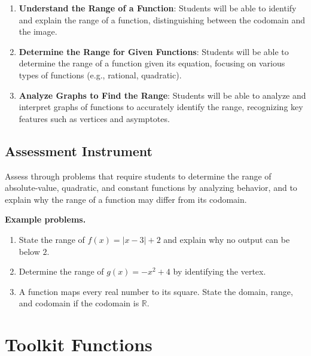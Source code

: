 \begin{enumerate}
    \item \textbf{Understand the Range of a Function}: Students will be able to identify and explain the range of a function, distinguishing between the codomain and the image.
    \item \textbf{Determine the Range for Given Functions}: Students will be able to determine the range of a function given its equation, focusing on various types of functions (e.g., rational, quadratic).
    \item \textbf{Analyze Graphs to Find the Range}: Students will be able to analyze and interpret graphs of functions to accurately identify the range, recognizing key features such as vertices and asymptotes.
\end{enumerate}

\subsection{Assessment Instrument}
\label{ssec:asse-7e68}

Assess through problems that require students to determine the range of absolute-value,
quadratic, and constant functions by analyzing behavior, and to explain why the range of a
function may differ from its codomain.

\textbf{Example problems.}

\begin{enumerate}
    \item State the range of $f(x) = |x - 3| + 2$ and explain why no output can be below $2$.
    \item Determine the range of $g(x) = -x^2 + 4$ by identifying the vertex.
    \item A function maps every real number to its square. State the domain, range, and codomain if the codomain is $\mathbb{R}$.
\end{enumerate}

\section{Toolkit Functions}
\label{sec:tool-4c3a}
